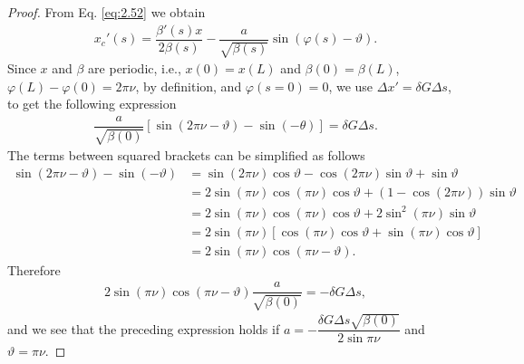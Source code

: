 \begin{proof}
From Eq. \eqref{eq:2.52} we obtain
\begin{align*}
x_c'(s) =\dfrac{\beta'(s)x}{2\beta(s)} - \dfrac{a}{\sqrt{\beta(s)}}\sin\left(\varphi(s) - \vartheta\right).
\end{align*}
Since $x$ and $\beta$ are periodic, i.e., $x(0)=x(L)$ and $\beta(0) = \beta(L)$, $\varphi(L) - \varphi(0) = 2 \pi \nu$, by definition, and $\varphi(s=0)=0$, we use $\Delta x' =  \delta G \Delta s$,
to get the following expression
\begin{align*}
\dfrac{a}{\sqrt{\beta(0)}}\left[\sin(2\pi \nu - \vartheta) - \sin(-\theta)\right] = \delta G \Delta s.
\end{align*}
The terms between squared brackets can be simplified as follows
\begin{align*}
\sin(2\pi \nu - \vartheta) - \sin(-\vartheta) &= \sin(2\pi \nu)\cos\vartheta - \cos(2\pi \nu)\sin \vartheta + \sin \vartheta\\
                                         &= 2\sin(\pi \nu)\cos(\pi \nu)\cos\vartheta + \left(1-\cos(2\pi \nu)\right)\sin\vartheta\\
                                           &= 2\sin(\pi \nu)\cos(\pi \nu)\cos\vartheta + 2\sin^2(\pi \nu)\sin\vartheta\\
                                           &= 2\sin(\pi\nu)\left[\cos(\pi\nu)\cos\vartheta + \sin(\pi\nu)\cos\vartheta\right] \\
                                           &=  2\sin(\pi\nu)\cos(\pi\nu - \vartheta).
\end{align*}
Therefore
\begin{align*}
2\sin(\pi\nu)\cos(\pi\nu - \vartheta)\dfrac{a}{\sqrt{\beta(0)}} = -\delta G \Delta s,
\end{align*}
and we see that the preceding expression holds if $a = -\dfrac{\delta G \Delta s \sqrt{\beta(0)}}{2 \sin \pi \nu}$ and $\vartheta = \pi \nu$.
\end{proof}


